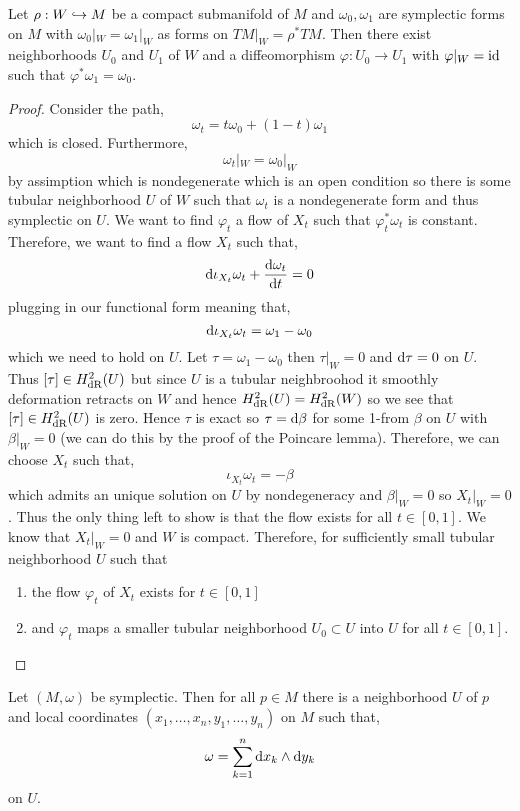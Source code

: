 \documentclass[12pt]{article}
\begin{document}
\begin{theorem}
Let $\rho : W \hookrightarrow M$ be a compact submanifold of $M$ and $\omega_0, \omega_1$ are symplectic forms on $M$ with $\omega_0 |_W = \omega_1 |_W$ as forms on $TM |_W = \rho^* TM$. Then there exist neighborhoods $U_0$ and $U_1$ of $W$ and a diffeomorphism $\varphi : U_0 \to U_1$ with $\varphi|_W = \mathrm{id}$ such that $\varphi^* \omega_1 = \omega_0$. 
\end{theorem}

\begin{proof}
Consider the path,
\[ \omega_t = t \omega_0 + (1-t) \omega_1 \]
which is closed. Furthermore,
\[ \omega_t |_W = \omega_0 |_W \]
by assimption which is nondegenerate which is an open condition so there is some tubular neighborhood $U$ of $W$ such that $\omega_t$ is a nondegenerate form and thus symplectic on $U$. We want to find $\varphi_t$ a flow of $X_t$ such that $\varphi^*_t \omega_t$ is constant. Therefore, we want to find a flow $X_t$ such that,
\[ \mathrm{d}{\iota_{X_t} \omega_t} + \frac{\mathrm{d}{\omega_t}}{\mathrm{d}{t}} = 0 \]
plugging in our functional form meaning that,
\[ \mathrm{d}{\iota_{X_t} \omega_t} = \omega_1 - \omega_0 \]
which we need to hold on $U$. Let $\tau = \omega_1 - \omega_0$ then $\tau|_W = 0$ and $\mathrm{d}{\tau} = 0$ on $U$. Thus $[\tau] \in H^2_{\mathrm{dR}}(U)$ but since $U$ is a tubular neighbroohod it smoothly deformation retracts on $W$ and hence $H^2_{\mathrm{dR}}(U) = H^2_{\mathrm{dR}}(W)$ so we see that $[\tau] \in H^2_{\mathrm{dR}}(U)$ is zero. Hence $\tau$ is exact so $\tau = \mathrm{d}{\beta}$ for some 1-from $\beta$ on $U$ with $\beta|_W = 0$ (we can do this by the proof of the Poincare lemma). Therefore, we can choose $X_t$ such that,
\[ \iota_{X_t} \omega_t = - \beta \]
which admits an unique solution on $U$ by nondegeneracy and $\beta|_W = 0$ so $X_t |_W = 0$. Thus the only thing left to show is that the flow exists for all $t \in [0,1]$. We know that $X_t|_W = 0$ and $W$ is compact. Therefore, for sufficiently small tubular neighborhood $U$ such that
\begin{enumerate}
\item the flow $\varphi_t$ of $X_t$ exists for $t \in [0,1]$
\item and $\varphi_t$ maps a smaller tubular neighborhood $U_0 \subset U$ into $U$ for all $t \in [0,1]$. 
\end{enumerate} 
\end{proof}

\begin{cor}[Darboux]
Let $(M, \omega)$ be symplectic. Then for all $p \in M$ there is a neighborhood $U$ of $p$ and local coordinates $(x_1, \dots, x_n, y_1, \dots, y_n)$ on $M$ such that,
\[ \omega = \sum_{k=1}^n \mathrm{d}{x_k} \wedge \mathrm{d}{y_k} \]
on $U$. 
\end{cor}
\end{document}
